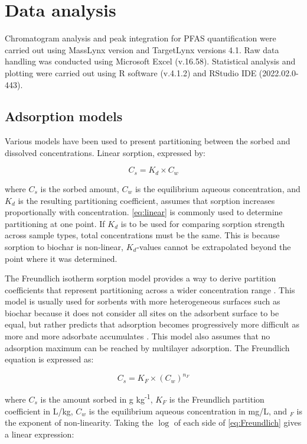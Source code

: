 \section{Data analysis}\label{sec:data_analysis}
Chromatogram analysis and peak integration for PFAS quantification were carried out using MassLynx version and TargetLynx versions 4.1.  Raw data handling was conducted using Microsoft Excel (v.16.58). Statistical analysis and plotting were carried out using R software (v.4.1.2) and RStudio IDE (2022.02.0-443).

\subsection{Adsorption models \label{sec:models}}
Various models have been used to present partitioning between the sorbed and dissolved concentrations. Linear sorption, expressed by: 

\begin{equation}\label{eq:linear}
C_s = K_d \times C_w
\end{equation}

where $C_s$ is the sorbed amount, $C_w$ is the equilibrium aqueous concentration, and $K_d$ is the resulting partitioning coefficient, assumes that sorption increases proportionally with concentration. \cref{eq:linear} is commonly used to determine partitioning at one point. If $K_d$ is to be used for comparing sorption strength across sample types, total concentrations must be the same. This is because sorption to biochar is non-linear, $K_d$-values cannot be extrapolated beyond the point where it was determined.

The Freundlich isotherm sorption model provides a way to derive partition coefficients that represent partitioning across a wider concentration range \citep{zhang2013sorption}. This model is usually used for sorbents with more heterogeneous surfaces such as biochar because it does not consider all sites on the adsorbent surface to be equal, but rather predicts that adsorption becomes progressively more difficult as more and more adsorbate accumulates \citep{yin2022insights,vanloon2017Ch14}. This model also assumes that no adsorption maximum can be reached by multilayer adsorption. The Freundlich equation is expressed as:

\begin{equation} \label{eq:Freundlich}
    C_s = K_F \times (C_{w})^{n_F}
\end{equation}

where $C_s$ is the amount sorbed in \textmu g kg\textsuperscript{-1}, $K_F$ is the Freundlich partition coefficient in L/kg, $C_{w}$ is the equilibrium aqueous concentration in mg/L, and $_F$ is the exponent of non-linearity. Taking the $\log$ of each side of \cref{eq:Freundlich} gives a linear expression:


